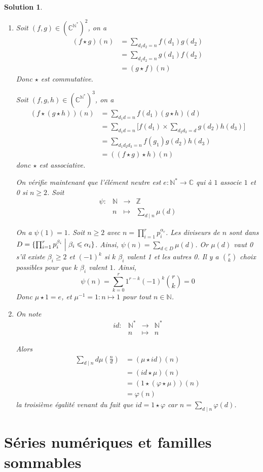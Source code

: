 \documentclass[12pt]{article}
\newtheorem{solution}{Solution}[section]
\theoremstyle{remark}
\newcommand{\C}{\mathbb{C}} \newcommand{\Q}{\mathbb{Q}}
\newcommand{\N}{\mathbb{N}} \newcommand{\Z}{\mathbb{Z}}
\newcommand{\function}[5]{
	$$
	\begin{array}{rccl}
		#1: & #2 & \to & #3 \\
		& #4 & \mapsto & #5
	\end{array}
	$$
}
\numberwithin{equation}{section}
\begin{document}
\begin{solution}
\begin{enumerate}
		\item Soit $(f,g)\in(\C^{\N^{*}})^{2}$, on a 
		\begin{align*}
			(f\star g)(n)
			&=\sum_{d_{1}d_{2}=n}f(d_{1})g(d_{2})\\
			&=\sum_{d_{1}d_{2}=n}g(d_{1})f(d_{2})\\
			&=(g\star f)(n)
		\end{align*}
		Donc $\star$ est commutative. 

		Soit $(f,g,h)\in(\C^{\N^{*}})^{3}$, on a 
		\begin{align*}
			(f\star (g\star h))(n)
			&=\sum_{d_{1}d=n}f(d_{1})(g\star h)(d)\\
			&=\sum_{d_{1}d=n}\Biggl[f(d_{1})\times \sum_{d_{2}d_{3}=d}g(d_{2})h(d_{3})\Biggr]\\
			&=\sum_{d_{1}d_{2}d_{3}=n}f(g_{1})g(d_{2})h(d_{3})\\
			&=((f\star g)\star h)(n)
		\end{align*}
		donc $\star$ est associative. 

		On vérifie maintenant que l'élément neutre est $e:\N^{*}\to\C$ qui à $1$ associe $1$ et 0 si $n\geqslant2$.
		Soit \function{\psi}{\N}{\Z}{n}{\sum_{d\mid n}\mu(d)}
		On a $\psi(1)=1$. Soit $n\geqslant2$ avec $n=\prod_{i=1}^{r}p_{i}^{\alpha_{r}}$. Les diviseurs de $n$ sont dans $D=\{\prod_{i=1}^{r}p_{i}^{\beta_{i}}\Bigm| \beta_{i}\leqslant\alpha_{i}\}$. Ainsi, $\psi(n)=\sum_{d\in D}\mu(d)$. Or $\mu(d)$ vaut 0 s'il existe $\beta_{i}\geqslant2$ et $(-1)^{k}$ si $k$ $\beta_{i}$ valent 1 et les autres 0. Il y a $\binom{r}{k}$ choix possibles pour que $k$ $\beta_{i}$ valent $1$. Ainsi,
		$$\psi(n)=\sum_{k=0}^{r}1^{r-k}(-1)^{k}\binom{r}{k}=0$$
		Donc $\mu\star 1=e$, et $\mu^{-1}=1\colon n\mapsto 1$ pour tout $n\in\N$.

		\item On note \function{id}{\N^{*}}{\N^{*}}{n}{n}
		Alors 
		\begin{align*}
			\sum_{d\mid n}d\mu(\frac{n}{d})
			&=(\mu\star id)(n)\\
			&=(id\star \mu)(n)\\
			&=(1\star (\varphi\star \mu))(n)\\
			&=\varphi(n)
		\end{align*}
		la troisième égalité venant du fait que $id=1\star\varphi$ car $n=\sum_{d\mid n}\varphi(d)$.
	\end{enumerate}
\end{solution}

\section{Séries numériques et familles sommables}
\end{document}
